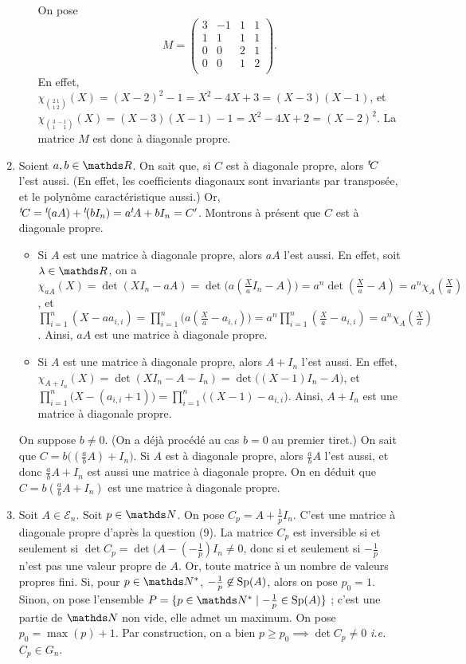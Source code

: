 \documentclass[a4paper]{article}
\begin{document}
\begin{enumerate}
\begin{enumerate}
					On pose \[
						M = \left(\begin{array}{cc|cc}
							3&-1&1&1\\
							1&1&1&1\\ \hline
							0&0&2&1\\
							0&0&1&2\\
						\end{array}\right)
					.\]
					En effet, $\chi_{{2\:1\choose1\:2}}(X) = (X-2)^2 - 1 = X^2 -4X + 3 = (X-3)(X-1)$, et $\chi_{{3\:-1\choose 1\:\mathbin{\phantom-}1}}(X) = (X-3)(X-1) - 1 = X^2 - 4X + 2 = (X - 2)^2$. La matrice $M$\/ est donc à diagonale propre.
			\end{enumerate}
		\item Soient $a,b \in \R$. On sait que, si $C$\/ est à diagonale propre, alors ${}^t\! C$\/ l'est aussi. (En effet, les coefficients diagonaux sont invariants par transposée, et le polynôme caractéristique aussi.) Or, ${}^t\! C = {}^t\!(a A) + {}^t\! (b I_n) = a {}^t\! A + b I_n = C'$. Montrons à présent que $C$\/ est à diagonale propre.
			\begin{itemize}
				\item Si $A$\/ est une matrice à diagonale propre, alors $a A$\/ l'est aussi. En effet, soit $\lambda \in \R$, on a $\chi_{aA}(X) = \det(X I_n - a A) = \det\big(a(\frac{X}{a} I_n - A)\big) = a^n \det(\frac{X}{a} - A) = a^n \chi_A(\frac{X}{a})$, et $\prod_{i=1}^n (X - a a_{i,i}) = \prod_{i=1}^n \big(a (\frac{X}{a} - a_{i,i})\big) = a^n \prod_{i=1}^n (\frac{X}{a} - a_{i,i}) = a^n \chi_A(\frac{X}{a})$. Ainsi, $aA$\/ est une matrice à diagonale propre.
				\item Si $A$\/ est une matrice à diagonale propre, alors $A + I_n$\/ l'est aussi. En effet, $\chi_{A + I_n}(X) = \det(X I_n - A - I_n) = \det\big((X-1) I_n - A\big)$, et $\prod_{i=1}^n \big(X-(a_{i,i}+1)\big) = \prod_{i=1}^n \big((X-1)-a_{i,i}\big)$. Ainsi, $A + I_n$\/ est une matrice à diagonale propre.
			\end{itemize}
			On suppose $b \neq 0$. (On a déjà procédé au cas $b = 0$\/ au premier tiret.) On sait que $C = b\big((\frac{a}{b}A) + I_n\big)$. Si $A$\/ est à diagonale propre, alors $\frac{a}{b}A$\/ l'est aussi, et donc $\frac{a}{b}A + I_n$\/ est aussi une matrice à diagonale propre. On en déduit que $C = b(\frac{a}{b}A + I_n)$\/ est une matrice à diagonale propre.
		\item Soit $A \in \mathcal{E}_n$. Soit $p \in \N$. On pose $C_p = A + \frac{1}{p} I_n$. C'est une matrice à diagonale propre d'après la question (9). La matrice $C_p$\/ est inversible si et seulement si $\det C_p = \det(A - (-\frac{1}{p})I_n \neq 0$, donc si et seulement si $-\frac{1}{p}$\/ n'est pas une valeur propre de $A$. Or, toute matrice à un nombre de valeurs propres fini. Si, pour $p \in \N^*$, $-\frac{1}{p} \not\in \operatorname{Sp}(A)$, alors on pose $p_0 = 1$. Sinon, on pose l'ensemble $P = \{p \in \N^*  \mid -\frac{1}{p} \in \Sp(A)\}$ ; c'est une partie de $\N$\/ non vide, elle admet un maximum. On pose $p_0 = \max(p) + 1$. Par construction, on a bien $p \ge p_0 \implies \det C_p \neq 0$\/ \textit{i.e.} $C_p \in G_n$.

\end{enumerate}
\end{document}
